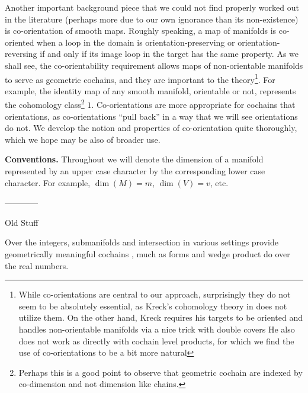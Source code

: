 Another important background piece that we could not find properly worked out in the literature (perhaps more due to our own ignorance than its non-existence) is co-orientation of smooth maps. Roughly speaking, a map of manifolds is co-oriented when a loop in the domain is orientation-preserving or orientation-reversing if and only if its image loop in the target has the same property. As we shall see, the co-orientability requirement allows maps of non-orientable manifolds to serve as geometric cochains, and they are important to the theory\footnote{While co-orientations are central to our approach, surprisingly they do not seem to be absolutely essential, as Kreck's cohomology theory in \cite{Krec10} does not utilize them. On the other hand, Kreck requires his targets to be oriented and handles non-orientable manifolds via a nice trick with double covers  He also does not work as directly with cochain level products, for which we find the use of co-orientations to be a bit more natural}. For example, the identity map of any smooth manifold, orientable or not, represents the cohomology class\footnote{Perhaps this is a good point to observe that geometric cochain are indexed by co-dimension and not dimension like chains.} $1$. Co-orientations are more appropriate for cochains that orientations, as co-orientations ``pull back'' in a way that we will see orientations do not. We develop the notion and properties of co-orientation quite thoroughly, which we hope may be also of broader use.








\textbf{Conventions.} Throughout we will denote the dimension of a manifold represented by an upper case character by the corresponding lower case character. For example, $\dim(M) = m$, $\dim(V) = v$, etc.



------------

Old Stuff


Over the integers, submanifolds and intersection in various settings provide geometrically meaningful cochains \cite{Lipy14, Joyc15},
much as forms and wedge product do over the real numbers.

